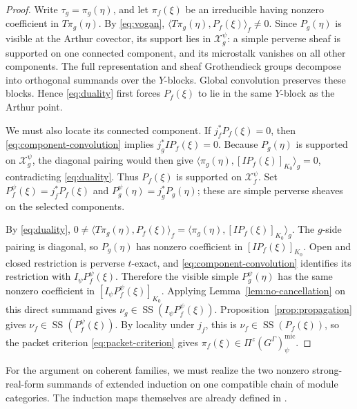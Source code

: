 \documentclass[10pt]{amsart}
\numberwithin{equation}{section}
\theoremstyle{plain}
\theoremstyle{definition}
\theoremstyle{remark}
\newcommand{\mic}{\mathrm{mic}}
\newcommand{\SSupp}{\operatorname{SS}}
\begin{document}
\begin{proof}
Write $\tau_g=\pi_g(\eta)$, and let $\pi_f(\xi)$ be an irreducible having
nonzero coefficient in $T\pi_g(\eta)$. By \eqref{eq:vogan},
$\langle T\pi_g(\eta),P_f(\xi)\rangle_f\neq0$.
Since $P_g(\eta)$ is visible at the Arthur covector, its support lies
in $\mathcal X_g^\psi$: a simple perverse sheaf is supported on one
connected component, and its microstalk vanishes on all other components.
The full representation and sheaf Grothendieck groups decompose into
orthogonal summands over the $Y$-blocks. Global convolution preserves
these blocks. Hence \eqref{eq:duality} first forces $P_f(\xi)$ to lie
in the same $Y$-block as the Arthur point.

We must also locate its connected component. If $j_f^*P_f(\xi)=0$,
then \eqref{eq:component-convolution} implies $j_g^*IP_f(\xi)=0$.
Because $P_g(\eta)$ is supported on $\mathcal X_g^\psi$, the diagonal
pairing would then give
$\langle\pi_g(\eta),[IP_f(\xi)]_{K_0}\rangle_g=0$, contradicting
\eqref{eq:duality}. Thus $P_f(\xi)$ is supported on
$\mathcal X_f^\psi$. Set $P_f^\psi(\xi)=j_f^*P_f(\xi)$ and
$P_g^\psi(\eta)=j_g^*P_g(\eta)$; these are simple perverse sheaves
on the selected components.

By \eqref{eq:duality},
$0\neq\langle T\pi_g(\eta),P_f(\xi)\rangle_f
=\langle\pi_g(\eta),[I P_f(\xi)]_{K_0}\rangle_g$.
The $g$-side pairing is diagonal, so $P_g(\eta)$ has nonzero coefficient
in $[IP_f(\xi)]_{K_0}$. Open and closed restriction is perverse
$t$-exact, and \eqref{eq:component-convolution} identifies its restriction
with $I_\psi P_f^\psi(\xi)$. Therefore the visible simple
$P_g^\psi(\eta)$ has the same nonzero coefficient in
$[I_\psi P_f^\psi(\xi)]_{K_0}$.
Applying Lemma~\ref{lem:no-cancellation} on this direct summand gives
$\nu_g\in\SSupp(I_\psi P_f^\psi(\xi))$.
Proposition~\ref{prop:propagation} gives
$\nu_f\in\SSupp(P_f^\psi(\xi))$. By locality under $j_f$, this is
$\nu_f\in\SSupp(P_f(\xi))$, so the packet criterion
\eqref{eq:packet-criterion} gives
$\pi_f(\xi)\in\Pi^z(G^\Gamma)^{\mic}_{\psi}$.
\end{proof}

For the argument on coherent families, we must realize the two nonzero
strong-real-form summands of extended induction on one compatible chain
of module categories. The induction maps themselves are already defined
in \cite[(2.6.1)]{AIMV26}.
\end{document}
